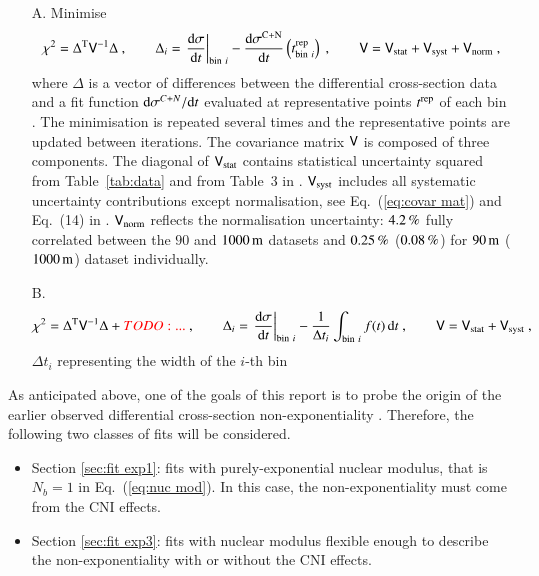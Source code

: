 \begin{enumerate}

\item[A.] Minimise
\begin{equation}
\label{eq:chi sq A}
	\chi^2 = \Delta^{\rm T} \mathsf{V}^{-1} \Delta\ ,\qquad
	\Delta_i = \left.{{\rm d}\sigma\over {\rm d} t}\right|_{{\rm bin}\ i} - {{\rm d}\sigma^{\rm C+N}\over{\rm d} t}\left(t^{\rm rep}_{{\rm bin}\ i}\right)\ ,\qquad
	\mathsf{V} = \mathsf{V}_{\rm stat} + \mathsf{V}_{\rm syst} + \mathsf{V}_{\rm norm}\ ,
\end{equation}
where $\Delta$ is a vector of differences between the differential cross-section data and a fit function ${\rm d}\sigma^{C+N}/{\rm d} t$ evaluated at representative points $t^{\rm rep}$ of each bin \cite{lafferty94}. The minimisation is repeated several times and the representative points are updated between iterations. The covariance matrix $\mathsf{V}$ is composed of three components. The diagonal of $\mathsf{V}_{\rm stat}$ contains statistical uncertainty squared from Table~\ref{tab:data} and from Table~3 in \cite{8tev-90m}. $\mathsf{V}_{\rm syst}$ includes all systematic uncertainty contributions except normalisation, see Eq.~(\ref{eq:covar mat}) and Eq.~(14) in \cite{8tev-90m}. $\mathsf{V}_{\rm norm}$ reflects the normalisation uncertainty: $4.2\,{\rm \%}$ fully correlated between the $90$ and $1000\,{\rm m}$ datasets and $0.25\,{\rm \%}$ ($0.08\,{\rm \%}$) for $90\,{\rm m}$ ($1000\,{\rm m}$) dataset individually.


\item[B.] 
\begin{equation}
\label{eq:chi sq B}
	\chi^2 = \Delta^{\rm T} \mathsf{V}^{-1} \Delta + {\color{red}TODO: ...}\ ,\qquad
	\Delta_i = \left.{{\rm d}\sigma\over {\rm d} t}\right|_{{\rm bin}\ i} - {1\over \Delta t_i} \int_{{\rm bin}\ i} f(t)\,{\rm d} t\ ,\qquad
	\mathsf{V} = \mathsf{V}_{\rm stat} + \mathsf{V}_{\rm syst}\ ,
\end{equation}
$\Delta t_i$ representing the width of the $i$-th bin

\end{enumerate}

As anticipated above, one of the goals of this report is to probe the origin of the earlier observed differential cross-section non-exponentiality \cite{8tev-90m}. Therefore, the following two classes of fits will be considered.
\begin{itemize}
\item Section \ref{sec:fit exp1}: fits with purely-exponential nuclear modulus, that is $N_b=1$ in Eq.~(\ref{eq:nuc mod}). In this case, the non-exponentiality must come from the CNI effects.
\item Section \ref{sec:fit exp3}: fits with nuclear modulus flexible enough to describe the non-exponentiality with or without the CNI effects.
\end{itemize}


